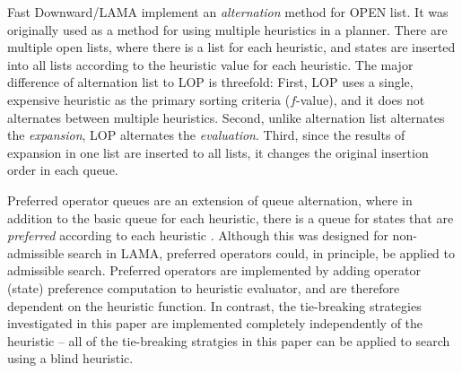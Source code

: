 
Fast Downward/LAMA implement an \emph{alternation}
method \cite{Helmert2006} for OPEN list. It was originally used as a method for using
multiple heuristics in a planner.  There are multiple open lists, where there is a list for each heuristic, and states are
inserted into all lists according to the heuristic value for each
heuristic.  The major difference of alternation list to LOP is threefold:
First, LOP uses a single, expensive heuristic as the primary sorting
criteria ($f$-value), and it does not alternates between multiple
heuristics. Second, unlike alternation list alternates the
\emph{expansion}, LOP alternates the \emph{evaluation}.
Third, since the results of expansion in one list are inserted to all lists,
it changes the original insertion order in each queue.

Preferred operator queues are an extension of queue alternation, where in addition to the basic queue for each heuristic, there is a queue for states that are \emph{preferred} according to each heuristic \cite{richter2010lama}.
Although this was designed for non-admissible search in LAMA, preferred operators could, in principle, be applied to admissible search. 
Preferred operators are implemented by adding operator (state) preference computation to heuristic evaluator, and are therefore dependent on the heuristic function.
In contrast, the tie-breaking strategies investigated in this paper are implemented completely independently of the heuristic -- all of the tie-breaking stratgies in this paper can be applied to search using a blind heuristic.

